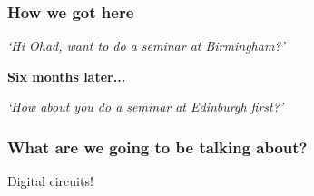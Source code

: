 \begin{frame}
    \frametitle{How we got here}
    \centering
    \wait
    \qquad
    \begin{minipage}{0.7\textwidth}
        \emph{`Hi Ohad, want to do a seminar at Birmingham?'}
    \end{minipage}

    \wait
    \LARGE
    \textbf{Six months later...}
    \normalsize
    \wait

    \begin{minipage}{0.6\textwidth}
        \emph{`How about you do a seminar at Edinburgh first?'}
    \end{minipage}
    \qquad
\end{frame}

\begin{frame}
    \frametitle{What are we going to be talking about?}

    \centering
    \LARGE
    Digital circuits!

    \begin{center}
    \end{center}

\end{frame}

